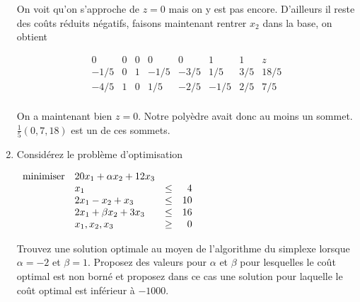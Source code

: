 \begin{enumerate}
\begin{solution}
      On voit qu'on s'approche de $z = 0$ mais on y est pas encore.
      D'ailleurs il reste des coûts réduits négatifs, faisons maintenant
      rentrer $x_2$ dans la base, on obtient

      \[
        \begin{array}{ccccccc|l}
           0   &  0   &  0 &  0   &  0   &  1   & 1   & z\\
          \hline
          -1/5 &  0   &  1 & -1/5 & -3/5 &  1/5 & 3/5 & 18/5\\
          -4/5 &  1   &  0 &  1/5 & -2/5 & -1/5 & 2/5 &  7/5\\
        \end{array}
      \]

      On a maintenant bien $z = 0$.
      Notre polyèdre avait donc au moins un sommet.
      $\frac{1}{5}(0,7,18)$ est un de ces sommets.
    \end{solution}

  \item  Considérez le problème d'optimisation

    $
    \begin{array}{llcr}
      \mbox{minimiser} & 20 x_1+\alpha x_2+12 x_3\\
      & x_1  & \leq & 4\\
      &2x_1 - x_2+x_3 & \leq & 10\\
      &2x_1+\beta x_2+ 3x_3 & \leq & 16\\
      & x_1, x_2, x_3 & \geq & 0
    \end{array}
    $

    Trouvez une solution optimale au moyen de l'algorithme du simplexe
    lorsque $\alpha = -2$ et $\beta = 1$.
    Proposez des valeurs pour $\alpha$ et $\beta$ pour lesquelles
    le coût optimal est non borné et
    proposez dans ce cas une solution pour laquelle le coût
    optimal est inférieur à $-1000$.


\end{enumerate}
